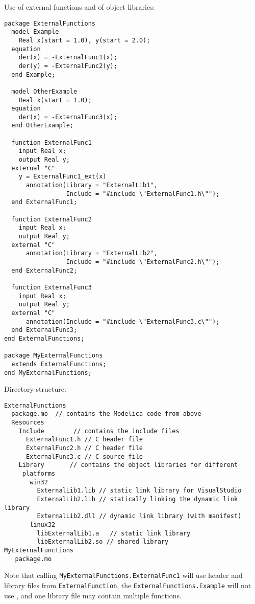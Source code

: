 \begin{example}
Use of external functions and of object libraries:
\begin{lstlisting}[language=modelica]
package ExternalFunctions
  model Example
    Real x(start = 1.0), y(start = 2.0);
  equation
    der(x) = -ExternalFunc1(x);
    der(y) = -ExternalFunc2(y);
  end Example;

  model OtherExample
    Real x(start = 1.0);
  equation
    der(x) = -ExternalFunc3(x);
  end OtherExample;

  function ExternalFunc1
    input Real x;
    output Real y;
  external "C"
    y = ExternalFunc1_ext(x)
      annotation(Library = "ExternalLib1",
                 Include = "#include \"ExternalFunc1.h\"");
  end ExternalFunc1;

  function ExternalFunc2
    input Real x;
    output Real y;
  external "C"
      annotation(Library = "ExternalLib2",
                 Include = "#include \"ExternalFunc2.h\"");
  end ExternalFunc2;

  function ExternalFunc3
    input Real x;
    output Real y;
  external "C"
      annotation(Include = "#include \"ExternalFunc3.c\"");
  end ExternalFunc3;
end ExternalFunctions;

package MyExternalFunctions
  extends ExternalFunctions;
end MyExternalFunctions;
\end{lstlisting}
Directory structure:
\begin{lstlisting}[language=modelica]
ExternalFunctions
  package.mo  // contains the Modelica code from above
  Resources
    Include        // contains the include files
      ExternalFunc1.h // C header file
      ExternalFunc2.h // C header file
      ExternalFunc3.c // C source file
    Library       // contains the object libraries for different
     platforms
       win32
         ExternalLib1.lib // static link library for VisualStudio
         ExternalLib2.lib // statically linking the dynamic link library
         ExternalLib2.dll // dynamic link library (with manifest)
       linux32
         libExternalLib1.a   // static link library
         libExternalLib2.so // shared library
MyExternalFunctions
   package.mo
\end{lstlisting}
Note that calling \lstinline!MyExternalFunctions.ExternalFunc1! will use
header and library files from \lstinline!ExternalFunction!, the \lstinline!ExternalFunctions.Example! will not use ,
and one library file may contain multiple functions.


\end{example}

